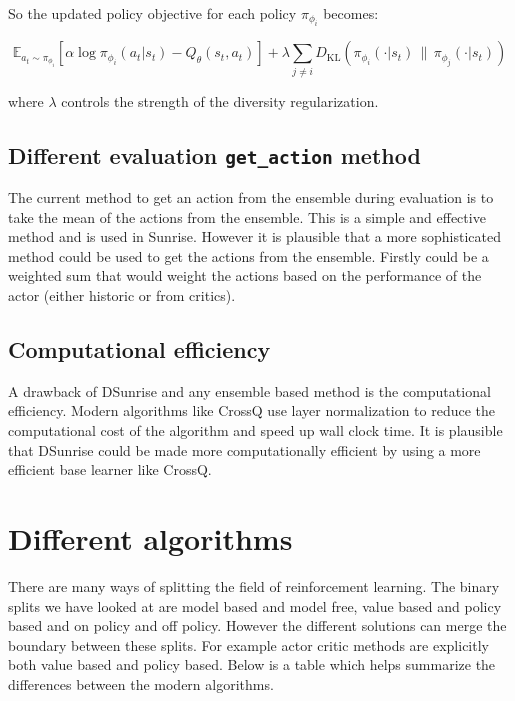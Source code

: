 So the updated policy objective for each policy $\pi_{\phi_i}$ becomes:

\[
\mathbb{E}_{a_t \sim \pi_{\phi_i}}\left[ \alpha \log \pi_{\phi_i} (a_t|s_t) - Q_\theta(s_t, a_t) \right]
+ \lambda \sum_{j \neq i} D_{\mathrm{KL}}\left(\pi_{\phi_i}(\cdot|s_t) \,\|\, \pi_{\phi_j}(\cdot|s_t)\right)
\]

where $\lambda$ controls the strength of the diversity regularization.

\subsection{Different evaluation \texttt{get\_action} method}
The current method to get an action from the ensemble during evaluation is to take the mean of the actions from the ensemble. This is a simple and effective method and is used in Sunrise. However it is plausible that a more sophisticated method could be used to get the actions from the ensemble. Firstly could be a weighted sum that would weight the actions based on the performance of the actor (either historic or from critics).

\subsection{Computational efficiency}
A drawback of DSunrise and any ensemble based method is the computational efficiency. Modern algorithms like CrossQ \cite{bhattCrossQBatchNormalization2024} use layer normalization to reduce the computational cost of the algorithm and speed up wall clock time. It is plausible that DSunrise could be made more computationally efficient by using a more efficient base learner like CrossQ.

\section{Different algorithms}

There are many ways of splitting the field of reinforcement learning. The binary splits we have looked at are model based and model free, value based and policy based and on policy and off policy. However the different solutions can merge the boundary between these splits. For example actor critic methods are explicitly both value based and policy based. Below is a table which helps summarize the differences between the modern algorithms.

